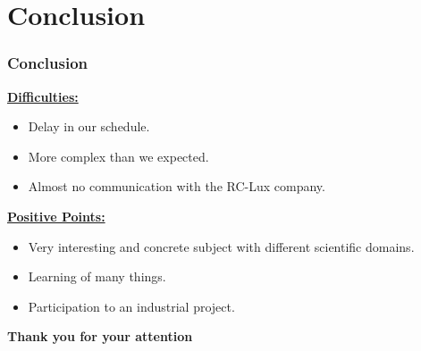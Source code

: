 \documentclass[xcolor=dvipsnames,10pt]{beamer}
\begin{document}

\section{Conclusion}

\begin{frame}
	\frametitle{Conclusion}
\underline{\textbf{\color{blue}Difficulties:}}\\
 \begin{itemize}
  \item Delay in our schedule.
  \item More complex than we expected.
  \item Almost no communication with the RC-Lux company.
  \end{itemize}

\underline{\textbf{\color{blue}Positive Points:}}\\ 
 \begin{itemize}
  \item Very interesting and concrete subject with different scientific domains.
  \item Learning of many things.
  \item Participation to an industrial project.
 \end{itemize}
\end{frame}

\begin{frame}
\vspace{8mm}
\hspace{4mm}
\huge{\textbf{\color{blue}Thank you for your attention}}
\end{frame}
\end{document}
